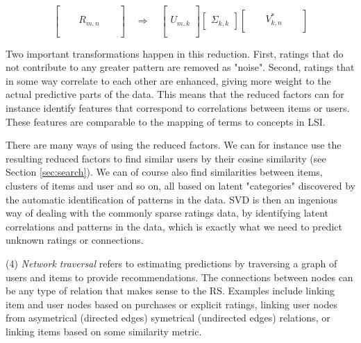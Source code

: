 \begin{equation*}
  \begin{bmatrix}
    { } & { } & { }     & { } & { }\\
    { } & { } & { }     & { } & { }\\
    { } & { } & R_{m,n} & { } & { }\\
    { } & { } & { }     & { } & { }\\
    { } & { } & { }     & { } & { }
  \end{bmatrix} 
  \quad 
  \Rightarrow
  \quad
  \begin{bmatrix}
    { }\\
    { }\\
    U_{m,k}\\
    { }\\
    { }
  \end{bmatrix}
  \begin{bmatrix}
    \Sigma_{k,k}
  \end{bmatrix}
  \begin{bmatrix}
    { } & { } & V_{k,n}^{*} & { } & { }\\
  \end{bmatrix} 
\end{equation*}

Two important transformations happen in this reduction. 
First, ratings that do not contribute to any greater pattern are removed as "noise".
Second, ratings that in some way correlate to each other are enhanced, giving more weight to the actual predictive parts of the data.
This means that the reduced factors can for instance identify features that correspond to correlations between items or users.
These features are comparable to the mapping of terms to concepts in LSI.

There are many ways of using the reduced factors.
We can for instance use the resulting reduced factors to find similar users by their cosine similarity (see Section \ref{sec:search}).
We can of course also find similarities between items, clusters of items and user and so on, all based on latent "categories"
discovered by the automatic identification of patterns in the data.
SVD is then an ingenious way of dealing with the commonly sparse ratings data, by identifying latent correlations and patterns in the data,
which is exactly what we need to predict unknown ratings or connections.

(4) \emph{Network traversal} refers to estimating predictions by traversing a graph of users and items to provide recommendations.
The connections between nodes can be any type of relation that makes sense to the RS. Examples include linking item and user nodes
based on purchases or explicit ratings, linking user nodes from asymetrical (directed edges) symetrical (undirected edges) relations,
or linking items based on some similarity metric.

